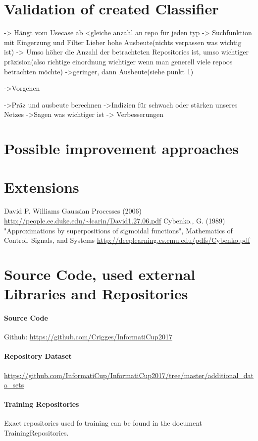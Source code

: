 \documentclass[paper=A4,pagesize=auto,11pt,headinclude=true,footinclude=true,BCOR=0mm,DIV=calc]{scrartcl}
\begin{document}
	\section{Validation of created Classifier}
	-> Hängt vom Usecase ab
	<gleiche anzahl an repo für jeden typ
	-> Suchfunktion mit Eingerzung und Filter Lieber hohe Ausbeute(nichts verpassen was wichtig ist)
	-> Umso höher die Anzahl der betrachteten Repositories ist, umso wichtiger präzision(also richtige einordnung wichtiger wenn man generell viele repoos betrachten möchte)
	->geringer, dann Ausbeute(siehe punkt 1)
	
	
	->Vorgehen
	
	->Präz und ausbeute berechnen
	->Indizien für schwach oder stärken unseres Netzes
	->Sagen was wichtiger ist
	-> Verbesserungen
	
	\section{Possible improvement approaches}
	
	\section{Extensions}
	
	
	\newpage
	
	\begin{thebibliography}{xxxxxx}
		 David P. Williams Gaussian Processes (2006) \url{http://people.ee.duke.edu/~lcarin/David1.27.06.pdf}
		  Cybenko., G. (1989) "Approximations by superpositions of sigmoidal functions", Mathematics of Control, Signals, and Systems \url{http://deeplearning.cs.cmu.edu/pdfs/Cybenko.pdf}
	\end{thebibliography}
	
	
	\section{Source Code, used external Libraries and Repositories}
	\paragraph{Source Code}
	Github: \url{https://github.com/Crigges/InformatiCup2017}\\
	\paragraph{Repository Dataset}
	\label{src:Repositories}
	\url{https://github.com/InformatiCup/InformatiCup2017/tree/master/additional_data_sets}	\\
	
	\label{src:TrainingRepositories}
	\paragraph{Training Repositories}
	Exact repositories used fo training can be found in the document TrainingRepositories.
	
	
	
\end{document}
